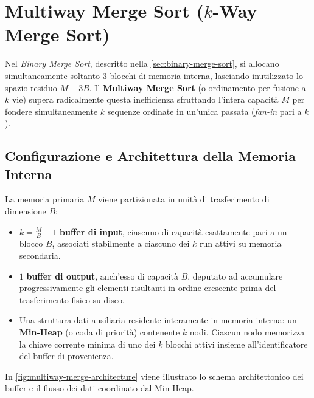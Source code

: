 \section{Multiway Merge Sort (\texorpdfstring{$k$}{k}-Way Merge Sort)}
\label{sec:multiway-merge-sort}

Nel \textit{Binary Merge Sort}, descritto nella \autoref{sec:binary-merge-sort}, si allocano simultaneamente soltanto 3 blocchi di memoria interna, lasciando inutilizzato lo spazio residuo $M - 3B$. Il \textbf{Multiway Merge Sort} (o ordinamento per fusione a $k$ vie) supera radicalmente questa inefficienza sfruttando l'intera capacità $M$ per fondere simultaneamente $k$ sequenze ordinate in un'unica passata (\textit{fan-in} pari a $k$).

\subsection{Configurazione e Architettura della Memoria Interna}
\label{subsec:multiway-memory-layout}

La memoria primaria $M$ viene partizionata in unità di trasferimento di dimensione $B$:
\begin{itemize}
  \item $k = \frac{M}{B} - 1$ \textbf{buffer di input}, ciascuno di capacità esattamente pari a un blocco $B$, associati stabilmente a ciascuno dei $k$ run attivi su memoria secondaria.
  \item $1$ \textbf{buffer di output}, anch'esso di capacità $B$, deputato ad accumulare progressivamente gli elementi risultanti in ordine crescente prima del trasferimento fisico su disco.
  \item Una struttura dati ausiliaria residente interamente in memoria interna: un \textbf{Min-Heap} (o coda di priorità) contenente $k$ nodi. Ciascun nodo memorizza la chiave corrente minima di uno dei $k$ blocchi attivi insieme all'identificatore del buffer di provenienza.
\end{itemize}

In \autoref{fig:multiway-merge-architecture} viene illustrato lo schema architettonico dei buffer e il flusso dei dati coordinato dal Min-Heap.

